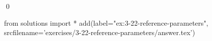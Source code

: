 
\begin{ex}
  \label{ex:3-22-reference-parameters}
  
  \qed
\end{ex}
\begin{python0}
from solutions import *
add(label="ex:3-22-reference-parameters",
    srcfilename='exercises/3-22-reference-parameters/answer.tex')
\end{python0}
